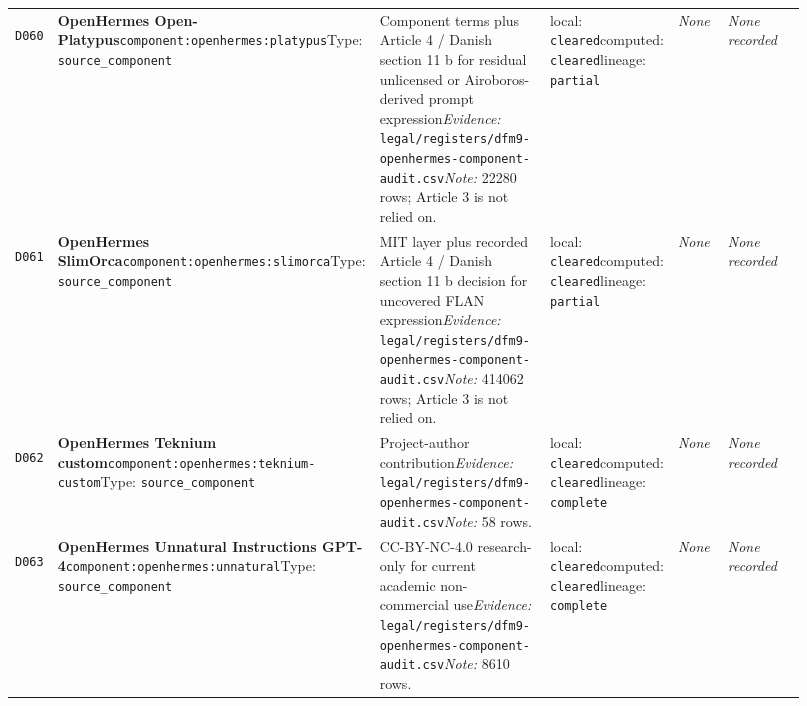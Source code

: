 \documentclass[9pt,a4paper]{article}
\newcommand{\depid}[1]{\hypertarget{dep:#1}{\texttt{#1}}}
\begin{document}
\begin{landscape}
\begin{longtable}{@{}L{0.035\linewidth}L{0.185\linewidth}L{0.27\linewidth}L{0.09\linewidth}L{0.10\linewidth}L{0.24\linewidth}@{}}
\depid{D060} & \textbf{OpenHermes Open-Platypus}\newline \nolinkurl{component:openhermes:platypus}\newline Type: \texttt{source\_component} & Component terms plus Article 4 / Danish section 11 b for residual unlicensed or Airoboros-derived prompt expression\newline \textit{Evidence:} \nolinkurl{legal/registers/dfm9-openhermes-component-audit.csv}\newline \textit{Note:} 22280 rows; Article 3 is not relied on. & local: \texttt{cleared}\newline computed: \texttt{cleared}\newline lineage: \texttt{partial} & \textit{None} & \textit{None recorded} \\
\depid{D061} & \textbf{OpenHermes SlimOrca}\newline \nolinkurl{component:openhermes:slimorca}\newline Type: \texttt{source\_component} & MIT layer plus recorded Article 4 / Danish section 11 b decision for uncovered FLAN expression\newline \textit{Evidence:} \nolinkurl{legal/registers/dfm9-openhermes-component-audit.csv}\newline \textit{Note:} 414062 rows; Article 3 is not relied on. & local: \texttt{cleared}\newline computed: \texttt{cleared}\newline lineage: \texttt{partial} & \textit{None} & \textit{None recorded} \\
\depid{D062} & \textbf{OpenHermes Teknium custom}\newline \nolinkurl{component:openhermes:teknium-custom}\newline Type: \texttt{source\_component} & Project-author contribution\newline \textit{Evidence:} \nolinkurl{legal/registers/dfm9-openhermes-component-audit.csv}\newline \textit{Note:} 58 rows. & local: \texttt{cleared}\newline computed: \texttt{cleared}\newline lineage: \texttt{complete} & \textit{None} & \textit{None recorded} \\
\depid{D063} & \textbf{OpenHermes Unnatural Instructions GPT-4}\newline \nolinkurl{component:openhermes:unnatural}\newline Type: \texttt{source\_component} & CC-BY-NC-4.0 research-only for current academic non-commercial use\newline \textit{Evidence:} \nolinkurl{legal/registers/dfm9-openhermes-component-audit.csv}\newline \textit{Note:} 8610 rows. & local: \texttt{cleared}\newline computed: \texttt{cleared}\newline lineage: \texttt{complete} & \textit{None} & \textit{None recorded} \\

\end{longtable}
\end{landscape}
\end{document}
